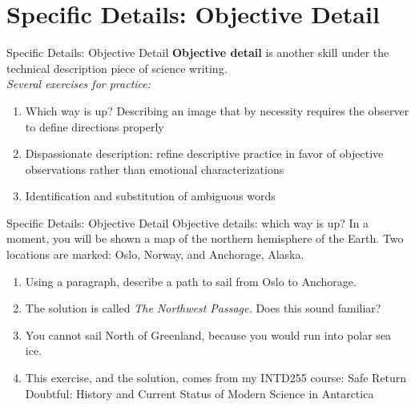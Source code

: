\documentclass{beamer}
\begin{document}
\section{Specific Details: Objective Detail}

\begin{frame}{Specific Details: Objective Detail}
\textbf{Objective detail} is another skill under the technical description piece of science writing. \\ \vspace{0.3cm}
\textit{Several exercises for practice:}
\begin{enumerate}
\item Which way is up?  Describing an image that by necessity requires the observer to define directions properly
\item \alert{Dispassionate description}: refine descriptive practice in favor of objective observations rather than emotional characterizations
\item Identification and substitution of ambiguous words
\end{enumerate}
\end{frame}

\begin{frame}{Specific Details: Objective Detail}
Objective details: which way is up?  In a moment, you will be shown a map of the northern hemisphere of the Earth.  Two locations are marked: Oslo, Norway, and Anchorage, Alaska. \\
\begin{enumerate}
\item Using a paragraph, describe a path to sail from Oslo to Anchorage.
\item The solution is called \textit{The Northwest Passage.}  Does this sound familiar?
\item You cannot sail North of Greenland, because you would run into polar sea ice.
\item This exercise, and the solution, comes from my INTD255 course: Safe Return Doubtful: History and Current Status of Modern Science in Antarctica
\end{enumerate}
\end{frame}
\end{document}
